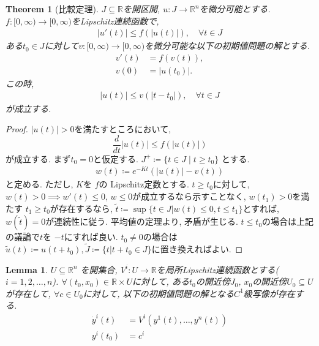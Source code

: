 \documentclass{ltjsarticle}
\newtheorem{theorem}{Theorem}
\newtheorem{lemma}{Lemma}
\begin{document}
  \begin{theorem}[比較定理]
    $J\subseteq \mathbb{R}$を開区間, $u : J\to \mathbb{R}^n$を微分可能とする. 
    $f:[0,\infty ) \to [0, \infty )$をLipschitz連続函数で, 
    \begin{equation}
      \begin{aligned}
        |u'(t) | \leq f(|u(t)|), \quad  \forall t \in J
      \end{aligned}
    \end{equation} 
    ある$t_0 \in J$に対して$v:[0, \infty) \to [0,\infty )$を微分可能な以下の初期値問題の解とする.
    \begin{align}
      v'(t) &= f(v(t)), \\
      v(0) &= |u(t_0)|.
    \end{align}
    この時,  
    \begin{equation}
      \begin{aligned}
        |u(t)| \leq v(|t-t_0|), \quad \forall t \in J
      \end{aligned}
    \end{equation} 
    が成立する. 
  \end{theorem}

  \begin{proof}
    $|u(t)| >0$を満たすところにおいて,  $$\frac{d}{dt} |u(t)| \leq f(|u(t)|)$$ が成立する. 
まず$t_0 = 0$と仮定する. $J^+ \coloneqq  \{t \in J\mid t \geq t_0\} $ とする. 
    \begin{equation}
      \begin{aligned}
        w(t) \coloneqq  e^{-Kt}\left( |u(t)| - v(t) \right) 
      \end{aligned}
    \end{equation} 
    と定める. ただし, $K$を $f$の Lipschitz定数とする. $t \geq t_0$に対して, $w(t)>0 \implies w'(t) \leq 0$, 
     $w \leq 0$が成立するなら示すことなく,  $w(t_1) > 0$を満たす $t_1 \geq t_0 $が存在するなら,  
     $\tilde{t}\coloneqq \sup \{t \in J| w(t) \leq 0, t \leq t_1\} $とすれば, $w(\tilde{t}) = 0$が連続性に従う. 
     平均値の定理より, 矛盾が生じる. $t \leq t_0$の場合は上記の議論で$t$を $-t$にすれば良い. 
     $t_0 \neq 0$の場合は$\tilde{u}(t)\coloneqq  u(t+t_0), \tilde{J} \coloneqq  \{t |t+t_0 \in J\} $に置き換えればよい. 

  \end{proof}

  \begin{lemma}
   $U \subseteq \mathbb{R}^n$ を開集合, $V^i : U \to \mathbb{R}$を局所Lipschitz連続函数とする($i = 1,2,\ldots ,n$). 
   $\forall (t_0,x_0) \in \mathbb{R}\times U$に対して, ある$t_0$の開近傍$J_0$, $x_0$の開近傍$U_0 \subseteq U$が存在して, 
   $\forall c \in U_0$に対して, 以下の初期値問題の解となる$C^1$級写像が存在する.
   \begin{align}
     \dot{y}^i (t) &= V^i(y^1(t), \ldots , y^n(t)) \\
     y^i(t_0) &= c^i 
   \end{align}
    
  \end{lemma}
\end{document}

